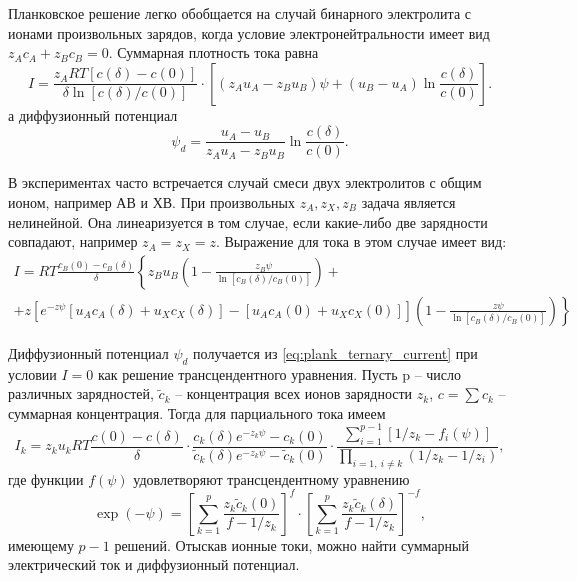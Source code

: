 Планковское решение легко обобщается на случай бинарного электролита с ионами
произвольных зарядов, когда условие электронейтральности имеет вид
\( z_Ac_A + z_Bc_B = 0\). Суммарная плотность тока равна
\begin{equation}
    I = \frac{z_ART[c(\delta) - c(0)]}{\delta\ln[c(\delta)/c(0)]}\cdot
    \left[(z_Au_A - z_Bu_B)\psi + (u_B - u_A)\ln\frac{c(\delta)}{c(0)}\right].
\end{equation}
а диффузионный потенциал
\begin{equation}
    \psi_d = \frac{u_A - u_B}{z_Au_A - z_Bu_B}\ln\frac{c(\delta)}{c(0)}.
\end{equation}

В экспериментах часто встречается случай смеси двух электролитов с общим ионом,
например АВ и ХВ. При произвольных \( z_A, z_X, z_B \) задача является
нелинейной. Она линеаризуется в том случае, если какие-либо две зарядности
совпадают, например \( z_A = z_X = z \). Выражение для тока в этом случае имеет
вид:
\begin{gather}
    I = RT\frac{c_B(0) - c_B(\delta)}{\delta}\left\{
        z_Bu_B\left(1-\frac{z_B\psi}{\ln[c_B(\delta)/c_B(0)]}\right)
        + \right.\\ +\left.
        z\left[e^{-z\psi}[u_Ac_A(\delta) + u_Xc_X(\delta)] -
        [u_Ac_A(0) + u_Xc_X(0)]\right]
        \left(1-\frac{z\psi}{\ln[c_B(\delta)/c_B(0)]}\right)\right\}
        \label{eq:plank_ternary_current}
\end{gather}

Диффузионный потенциал \( \psi_d \) получается из
\eqref{eq:plank_ternary_current} при условии \( I = 0 \) как решение
трансцендентного уравнения. Пусть p -- число различных зарядностей,
\( \tilde{c}_k \) -- концентрация всех ионов зарядности \( z_k \),
\( c = \sum c_k \) -- суммарная концентрация. Тогда для парциального тока имеем
\begin{equation}
    I_k = z_ku_kRT\frac{c(0) - c(\delta)}{\delta}\cdot
    \frac{c_k(\delta)e^{-z_k\psi}-c_k(0)}
        {\tilde{c}_k(\delta)e^{-z_k\psi}-\tilde{c}_k(0)}\cdot
    \frac{\sum_{i=1}^{p-1}[1/z_k - f_i(\psi)]}
        {\prod_{i=1,\ i \neq k}(1/z_k - 1/z_i)},
\end{equation}
где функции \( f(\psi) \) удовлетворяют трансцендентному уравнению
\begin{equation}
    \exp(-\psi) = \left[\sum_{k=1}^p\frac{z_k\tilde{c}_k(0)}{f-1/z_k}\right]^f
    \cdot \left[\sum_{k=1}^p\frac{z_k\tilde{c}_k(\delta)}{f-1/z_k}\right]^{-f},
\end{equation}
имеющему \( p-1 \) решений. Отыскав ионные токи, можно найти суммарный
электрический ток и диффузионный потенциал.

